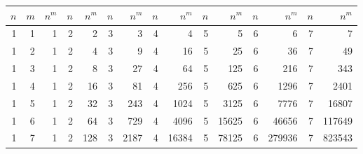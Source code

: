 \begin{tabular}{rrrrrrrrrrrrrrr}
\toprule
$n$&
$m$&
$n^m$&
$n$&
$n^m$&
$n$&
$n^m$&
$n$&
$n^m$&
$n$&
$n^m$&
$n$&
$n^m$&
$n$&
$n^m$\\
\midrule
1 & 1 & 1 & 2 & 2 & 3 & 3 & 4 & 4 & 5 & 5 & 6 & 6 & 7 & 7\\
1 & 2 & 1 & 2 & 4 & 3 & 9 & 4 & 16 & 5 & 25 & 6 & 36 & 7 & 49\\
1 & 3 & 1 & 2 & 8 & 3 & 27 & 4 & 64 & 5 & 125 & 6 & 216 & 7 & 343\\
1 & 4 & 1 & 2 & 16 & 3 & 81 & 4 & 256 & 5 & 625 & 6 & 1296 & 7 & 2401\\
1 & 5 & 1 & 2 & 32 & 3 & 243 & 4 & 1024 & 5 & 3125 & 6 & 7776 & 7 & 16807\\
1 & 6 & 1 & 2 & 64 & 3 & 729 & 4 & 4096 & 5 & 15625 & 6 & 46656 & 7 & 117649\\
1 & 7 & 1 & 2 & 128 & 3 & 2187 & 4 & 16384 & 5 & 78125 & 6 & 279936 & 7 & 823543\\
\bottomrule
\end{tabular}
